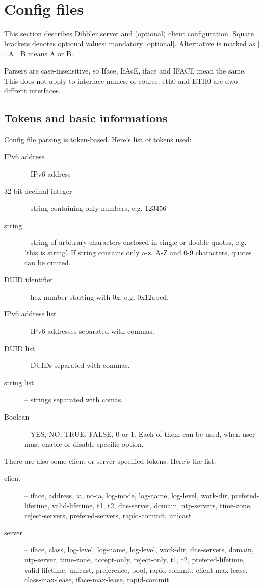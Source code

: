 
\section{Config files}

This section describes Dibbler server and (optional) client
configuration. Square brackets denotes optional values: mandatory
[optional]. Alternative is marked as $\mid$. A $\mid$ B means A or B.

Parsers are case-insensitive, so Iface, IfAcE, iface and IFACE mean the
same. This does not apply to interface names, of course. eth0 and ETH0
are dwo diffrent interfaces.

\subsection{Tokens and basic informations}
Config file parsing is token-based. Here's list of tokens used:
\begin{description}
\item[IPv6 address] -- IPv6 address 
\item[32-bit decimal integer] -- string containing only numbers, e.g. 123456
\item[string] -- string of arbitrary characters enclosed in single or double
  quotes, e.g. 'this is string'. If string contains only a-z, A-Z and
  0-9 characters, quotes can be omited.
\item[DUID identifier] -- hex number starting with 0x, e.g. 0x12abcd.
\item[IPv6 address list] -- IPv6 addresses separated with commas.
\item[DUID list] -- DUIDs separated with commas.
\item[string list] -- strings separated with comas.
\item[Boolean] -- YES, NO, TRUE, FALSE, 0 or 1. Each of them can be
  used, when user must enable or disable specific option.
\end{description}

There are also some client or server specified tokens. Here's the list:
\begin{description}
\item[client] -- iface, address, ia, no-ia,
log-mode, log-name, log-level, work-dir, prefered-lifetime, valid-lifetime,
t1, t2, dns-server, domain, ntp-servers, time-zone, reject-servers,
prefered-servers, rapid-commit, unicast
\item[server] -- iface, class, log-level, log-name,
  log-level, work-dir, dns-servers, domain, ntp-server, time-zone, accept-only,
  reject-only, t1, t2, prefered-lifetime, valid-lifetime, unicast,
  preference, pool, rapid-commit, client-max-lease, class-max-lease,
  iface-max-lease, rapid-commit
\end{description}

